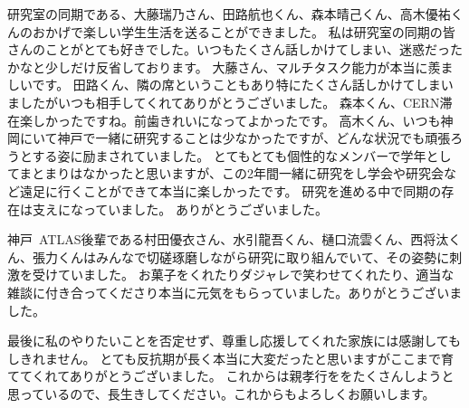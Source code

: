 研究室の同期である、大藤瑞乃さん、田路航也くん、森本晴己くん、高木優祐くんのおかげで楽しい学生生活を送ることができました。
私は研究室の同期の皆さんのことがとても好きでした。いつもたくさん話しかけてしまい、迷惑だったかなと少しだけ反省しております。
大藤さん、マルチタスク能力が本当に羨ましいです。
田路くん、隣の席ということもあり特にたくさん話しかけてしまいましたがいつも相手してくれてありがとうございました。
森本くん、CERN滞在楽しかったですね。前歯きれいになってよかったです。
高木くん、いつも神岡にいて神戸で一緒に研究することは少なかったですが、どんな状況でも頑張ろうとする姿に励まされていました。
とてもとても個性的なメンバーで学年としてまとまりはなかったと思いますが、この2年間一緒に研究をし学会や研究会など遠足に行くことができて本当に楽しかったです。
研究を進める中で同期の存在は支えになっていました。
ありがとうございました。

神戸~ATLAS後輩である村田優衣さん、水引龍吾くん、樋口流雲くん、西将汰くん、張力くんはみんなで切磋琢磨しながら研究に取り組んでいて、その姿勢に刺激を受けていました。
お菓子をくれたりダジャレで笑わせてくれたり、適当な雑談に付き合ってくださり本当に元気をもらっていました。ありがとうございました。

最後に私のやりたいことを否定せず、尊重し応援してくれた家族には感謝してもしきれません。
とても反抗期が長く本当に大変だったと思いますがここまで育ててくれてありがとうございました。
これからは親孝行ををたくさんしようと思っているので、長生きしてください。これからもよろしくお願いします。